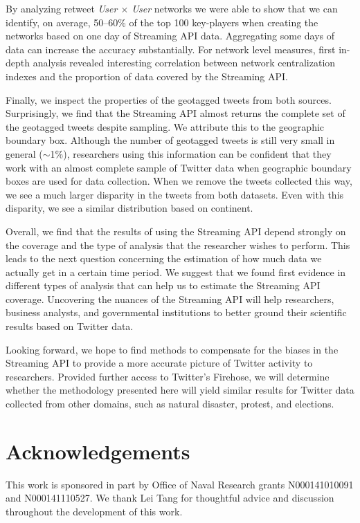 \documentclass[letterpaper]{article}
\begin{document}
By analyzing retweet \emph{User $\times$ User} networks we were able to show that we can identify, on average, 50--60\% of the top 100 key-players when creating the networks based on one day of Streaming API data. Aggregating some days of data can increase the accuracy substantially. For network level measures, first in-depth analysis revealed interesting correlation between network centralization indexes and the proportion of data covered by the Streaming API.

Finally, we inspect the properties of the geotagged tweets from both sources. Surprisingly, we find that the Streaming API almost returns the complete set of the geotagged tweets despite sampling. We attribute this to the geographic boundary box. Although the number of geotagged tweets is still very small in general ($\sim$1\%), researchers using this information can be confident that they work with an almost complete sample of Twitter data when geographic boundary boxes are used for data collection. When we remove the tweets collected this way, we see a much larger disparity in the tweets from both datasets. Even with this disparity, we see a similar distribution based on continent.

Overall, we find that the results of using the Streaming API depend strongly on the coverage and the type of analysis that the researcher wishes to perform. This leads to the next question concerning the estimation of how much data we actually get in a certain time period. We suggest that we found first evidence in different types of analysis that can help us to estimate the Streaming API coverage. Uncovering the nuances of the Streaming API will help researchers, business analysts, and governmental institutions to better ground their scientific results based on Twitter data.

Looking forward, we hope to find methods to compensate for the biases in the Streaming API to provide a more accurate picture of Twitter activity to researchers. Provided further access to Twitter's Firehose, we will determine whether the methodology presented here will yield similar results for Twitter data collected from other domains, such as natural disaster, protest, and elections.

\section{Acknowledgements}
This work is sponsored in part by Office of Naval Research grants N000141010091 and N000141110527. We thank Lei Tang for thoughtful advice and discussion throughout the development of this work.


\end{document}
